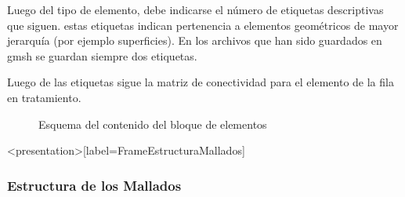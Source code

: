 Luego del tipo de elemento, debe indicarse el número de 
etiquetas descriptivas que siguen. estas etiquetas indican
pertenencia  a elementos geométricos de mayor jerarquía 
(por ejemplo superficies). En los archivos
que han sido guardados en gmsh se guardan siempre dos 
etiquetas. 

Luego de las etiquetas sigue la matriz de conectividad para 
el elemento de la fila en tratamiento.

\begin{figure}
  \caption{Esquema del contenido del bloque de elementos
  \label{FiguraDefinicionElementos} }
  
\end{figure}

\mode*
\begin{frame}<presentation>[label=FrameEstructuraMallados]
  \frametitle{Estructura de los Mallados}
  \hfill
\end{frame}

